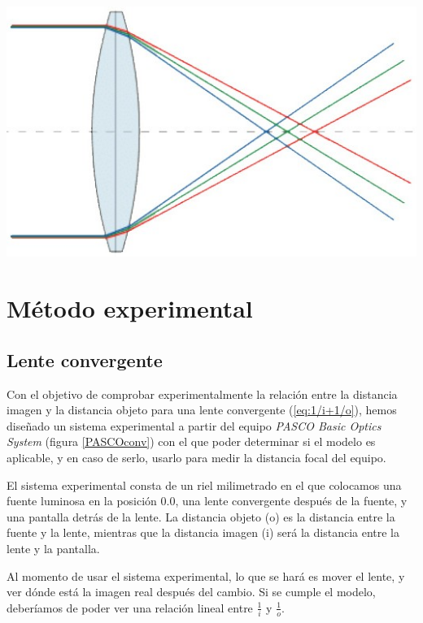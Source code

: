 \documentclass[a4paper,12pt]{article}
\newenvironment{Figure}
  {\par\medskip\noindent\minipage{\linewidth}}
  {\endminipage\par\medskip}
\begin{document}
\begin{multicols*}{2}
        \begin{Figure}
            \centering
            \includegraphics[width=0.7\linewidth]{AberracionCromatica.jpg}
            \label{f: abcro}
        \end{Figure}

\newpage

\section*{Método experimental}

    \subsection*{Lente convergente}
    
        Con el objetivo de comprobar experimentalmente la relación entre la distancia imagen y la distancia objeto para una lente convergente (\ref{eq:1/i+1/o}), hemos diseñado un sistema experimental a partir del equipo \emph{PASCO Basic Optics System} (figura \ref{PASCOconv}) con el que poder determinar si el modelo es aplicable, y en caso de serlo, usarlo para medir la distancia focal del equipo.

        El sistema experimental consta de un riel milimetrado en el que colocamos una fuente luminosa en la posición 0.0, una lente convergente después de la fuente, y una pantalla detrás de la lente. La distancia objeto (o) es la distancia entre la fuente y la lente, mientras que la distancia imagen (i) será la distancia entre la lente y la pantalla.

        Al momento de usar el sistema experimental, lo que se hará es mover el lente, y ver dónde está la imagen real después del cambio. Si se cumple el modelo, deberíamos de poder ver una relación lineal entre $\frac{1}{i}$ y $\frac{1}{o}$.


\end{multicols*}
\end{document}
